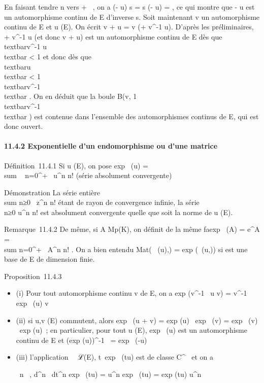 En faisant tendre n vers + \infty~, on a
(\mathrmIdE - u) \cdot s = s \cdot
(\mathrmIdE - u) =
\mathrmIdE, ce qui montre que
\mathrmIdE - u est un automorphisme continu
de E d'inverse s. Soit maintenant v un automorphisme continu de E et u
(E). On écrit v + u = v \cdot (\mathrmIdE +
v^-1 \cdot u). D'après les préliminaires,
\mathrmIdE + v^-1 \cdot u (et donc v
+ u) est un automorphisme continu de E dès que
\\textbar{}v^-1 \cdot u\\textbar{}
\textless{} 1 et donc dès que
\\textbar{}u\\textbar{} \textless{} 1
\over
\\textbar{}v^-1\\textbar{} .
On en déduit que la boule B(v, 1 \over
\\textbar{}v^-1\\textbar{} )
est contenue dans l'ensemble des automorphismes continus de E, qui est
donc ouvert.

\paragraph{11.4.2 Exponentielle d'un endomorphisme ou d'une matrice}

Définition~11.4.1 Si u (E), on pose exp~ (u)
= \\sum ~
n=0^+\infty~ u^n \over n! (série
absolument convergente)

Démonstration La série entière
\\sum  n≥0~
z^n \over n! étant de rayon de convergence
infinie, la série \\\sum
 n≥0 u^n \over n! est
absolument convergente quelle que soit la norme de u (E).

Remarque~11.4.2 De même, si A \in Mp(K), on définit de la même
fa\ccon exp~ (A) =
e^A =\ \\sum
 n=0^+\infty~ A^n \over n! .
On a bien entendu
Mat(\exp~ (u),)
= exp (\Mat~(u,)) si
 est une base de E de dimension finie.

Proposition~11.4.3

\begin{itemize}
\item
  (i) Pour tout automorphisme continu v de E, on a
  exp (v^-1~ \cdot u \cdot v) =
  v^-1 \cdot exp~ (u) \cdot v
\item
  (ii) si u,v (E) commutent, alors exp~ (u +
  v) = exp (u) \cdot\ exp~
  (v) = exp~ (v) \cdot\
  exp (u)~; en particulier, pour tout u (E),
  exp~ (u) est un automorphisme continu de E et
  (exp (u))^-1~
  = exp~ (-u)
\item
  (iii) l'application ~\mapsto~ℒ(E),
  t\mapsto~exp~ (tu) est de
  classe C^\infty~ et on a

  \forall~n \in {}~, d^n~
  \over dt^n  exp~
  (tu) = u^n \cdot exp~ (tu)
  = exp (tu) \cdot u^n~
\end{itemize}

